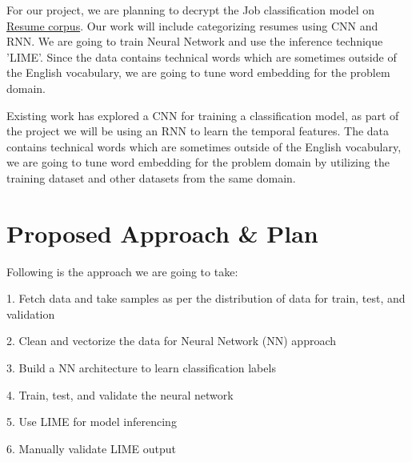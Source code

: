 \documentclass[11pt,letterpaper]{article}
\begin{document}
For our project, we are planning to decrypt the Job classification model on \href{https://github.com/florex/resume_corpus/blob/master/resumes_corpus.zip}{Resume corpus}. Our work will include categorizing resumes using CNN and RNN. We are going to train Neural Network and use the inference technique 'LIME'. Since the data contains technical words which are sometimes outside of the English vocabulary, we are going to tune word embedding for the problem domain.


Existing work has explored a CNN for training a classification model, as part of the project we will be using an RNN to learn the temporal features. The data contains technical words which are sometimes outside of the English vocabulary, we are going to tune word embedding for the problem domain by utilizing the training dataset and other datasets from the same domain.




\section{Proposed Approach \& Plan}




Following is the approach we are going to take:


1. Fetch data and take samples as per the distribution of data for train, test, and validation

2. Clean and vectorize the data for Neural Network (NN) approach

3. Build a NN architecture to learn classification labels

4. Train, test, and validate the neural network

5. Use LIME for model inferencing

6. Manually validate LIME output
\end{document}
